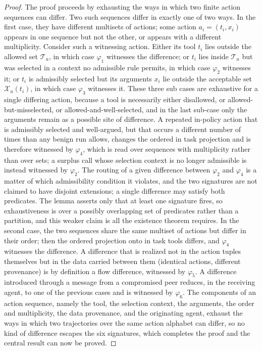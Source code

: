 \documentclass[journal]{IEEEtran}
\theoremstyle{remark}
\begin{document}
\begin{proof}
The proof proceeds by exhausting the ways in which two finite action sequences can differ. Two such sequences differ in exactly one of two ways. In the first case, they have different multisets of actions; some action $a_i=(t_i,x_i)$ appears in one sequence but not the other, or appears with a different multiplicity. Consider such a witnessing action. Either its tool $t_i$ lies outside the allowed set $\mathcal{T}_u$, in which case $\varphi_1$ witnesses the difference; or $t_i$ lies inside $\mathcal{T}_u$ but was selected in a context no admissible rule permits, in which case $\varphi_2$ witnesses it; or $t_i$ is admissibly selected but its arguments $x_i$ lie outside the acceptable set $\mathcal{X}_u(t_i)$, in which case $\varphi_3$ witnesses it. These three sub cases are exhaustive for a single differing action, because a tool is necessarily either disallowed, or allowed-but-misselected, or allowed-and-well-selected, and in the last sub-case only the arguments remain as a possible site of difference. A repeated in-policy action that is admissibly selected and well-argued, but that occurs a different number of times than any benign run allows, changes the ordered in task projection and is therefore witnessed by $\varphi_4$, which is read over sequences with multiplicity rather than over sets; a surplus call whose selection context is no longer admissible is instead witnessed by $\varphi_2$. The routing of a given difference between $\varphi_2$ and $\varphi_4$ is a matter of which admissibility condition it violates, and the two signatures are not claimed to have disjoint extensions; a single difference may satisfy both predicates. The lemma asserts only that at least one signature fires, so exhaustiveness is over a possibly overlapping set of predicates rather than a partition, and this weaker claim is all the existence theorem requires. In the second case, the two sequences share the same multiset of actions but differ in their order; then the ordered projection onto in task tools differs, and $\varphi_4$ witnesses the difference. A difference that is realized not in the action tuples themselves but in the data carried between them (identical actions, different provenance) is by definition a flow difference, witnessed by $\varphi_5$. A difference introduced through a message from a compromised peer reduces, in the receiving agent, to one of the previous cases and is witnessed by $\varphi_6$. The components of an action sequence, namely the tool, the selection context, the arguments, the order and multiplicity, the data provenance, and the originating agent, exhaust the ways in which two trajectories over the same action alphabet can differ, so no kind of difference escapes the six signatures, which completes the proof and the central result can now be proved.
\end{proof}
\end{document}
